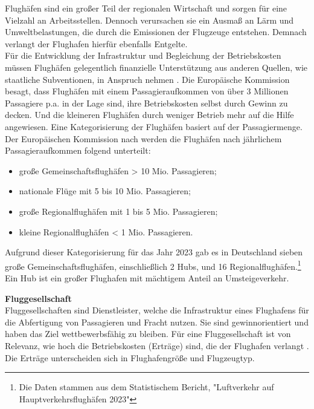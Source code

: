 Flughäfen sind ein großer Teil der regionalen Wirtschaft \cite{schaar2010analysis} und sorgen für eine Vielzahl an Arbeitsstellen. 
Dennoch verursachen sie ein Ausmaß an Lärm und Umweltbelastungen, die durch die Emissionen der Flugzeuge entstehen.
Demnach verlangt der Flughafen hierfür ebenfalls Entgelte. \\ %
%
Für die Entwicklung der Infrastruktur und Begleichung der Betriebskosten müssen Flughäfen gelegentlich finanzielle Unterstützung aus anderen
Quellen, wie staatliche Subventionen, in Anspruch nehmen \cite{schaar2010analysis}.
Die Europäische Kommission besagt, dass Flughäfen mit einem Passagieraufkommen von über 3 Millionen 
Passagiere p.a. in der Lage sind, ihre Betriebskosten selbst durch Gewinn zu decken. %
Und die kleineren Flughäfen durch weniger Betrieb mehr auf die Hilfe angewiesen.
Eine Kategorisierung der Flughäfen basiert auf der Passagiermenge. Der Europäischen Kommission 
nach werden die Flughäfen nach jährlichem Passagieraufkommen folgend unterteilt: 
\begin{itemize}
    \item große Gemeinschaftsflughäfen > 10 Mio. Passagieren;
    \item nationale Flüge mit 5 bis 10 Mio. Passagieren;
    \item große Regionalflughäfen mit 1 bis 5 Mio. Passagieren;
    \item kleine Regionalflughäfen < 1 Mio. Passagieren.
\end{itemize}
Aufgrund dieser Kategorisierung für das Jahr 2023 gab es in Deutschland 
sieben große Gemeinschaftsflughäfen, einschließlich 2 Hubs, und 16 Regionalflughäfen.\footnote{Die Daten stammen aus dem Statistischem Bericht, "Luftverkehr auf Hauptverkehrsflughäfen 2023"}
Ein Hub ist ein großer Flughafen mit mächtigem Anteil an Umsteigeverkehr.

\textbf{Fluggesellschaft} \\
Fluggesellschaften sind Dienstleister, welche die Infrastruktur eines Flughafens für die Abfertigung von Passagieren und Fracht nutzen. 
Sie sind gewinnorientiert und haben das Ziel wettbewerbsfähig zu bleiben. 
Für eine Fluggesellschaft ist von Relevanz, wie hoch die Betriebskosten (Erträge)
sind, die der Flughafen verlangt \cite{schaar2010analysis}. Die Erträge unterscheiden sich in Flughafengröße und Flugzeugtyp.


